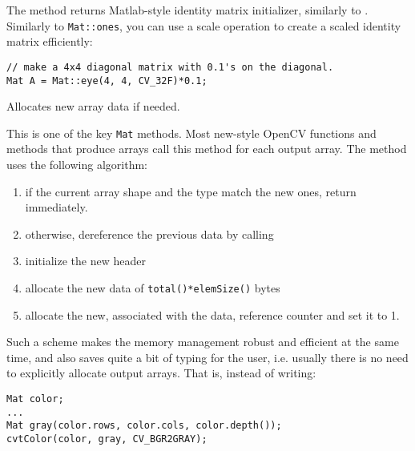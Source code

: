 The method returns Matlab-style identity matrix initializer, similarly to . Similarly to \texttt{Mat::ones}, you can use a scale operation to create a scaled identity matrix efficiently:

\begin{lstlisting}
// make a 4x4 diagonal matrix with 0.1's on the diagonal.
Mat A = Mat::eye(4, 4, CV_32F)*0.1;
\end{lstlisting}


Allocates new array data if needed.

\begin{description}
\end{description}

This is one of the key \texttt{Mat} methods. Most new-style OpenCV functions and methods that produce arrays call this method for each output array. The method uses the following algorithm:

\begin{enumerate}
\item if the current array shape and the type match the new ones, return immediately.
\item otherwise, dereference the previous data by calling 
\item initialize the new header
\item allocate the new data of \texttt{total()*elemSize()} bytes
\item allocate the new, associated with the data, reference counter and set it to 1.
\end{enumerate}

Such a scheme makes the memory management robust and efficient at the same time, and also saves quite a bit of typing for the user, i.e. usually there is no need to explicitly allocate output arrays. That is, instead of writing:

\begin{lstlisting}
Mat color;
...
Mat gray(color.rows, color.cols, color.depth());
cvtColor(color, gray, CV_BGR2GRAY);
\end{lstlisting}

